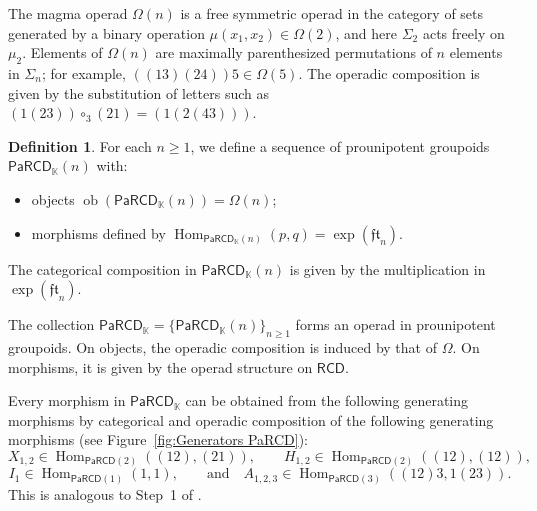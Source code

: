 \documentclass{amsart}
\newcommand{\kk}{\mathbb{K}}    %
\newcommand{\PaRCD}{\mathsf{PaRCD}}
\newcommand{\RCD}{\mathsf{RCD}}
\newcommand{\magma}{\Omega}
\newcommand{\hPaRCD}{{\PaRCD}_{\kk}}
\newcommand{\Hom}{\operatorname{Hom}}
\newcommand{\ob}{\operatorname{ob}}
\theoremstyle{definition}
\newtheorem{definition}[theorem]{Definition}%
\numberwithin{equation}{section}
\begin{document}
The magma operad $\magma(n)$ is a free symmetric operad in the category of sets generated by a binary operation $\mu(x_1,x_2) \in \Omega(2)$, and here $\Sigma_2$ acts freely on $\mu_2$. Elements of $\magma(n)$ are maximally parenthesized permutations of $n$ elements in $\Sigma_n$; for example, $((13)(24))5 \in \magma(5)$. The operadic composition is given by the substitution of letters such as $(1(23)) \circ_3 (21) = (1(2(43)))$. 


\begin{definition}\label{def: PaRCD}
For each $n\geq 1$, we define a sequence of prounipotent groupoids $\hPaRCD(n)$ with: 
\begin{itemize}
    \item objects $\ob(\hPaRCD(n))=\magma(n)$; 
    \item morphisms defined by $\Hom_{\hPaRCD(n)}(p,q) = \exp(\mathfrak{ft}_n)$.
\end{itemize} 
The categorical composition in $\hPaRCD(n)$ is given by the multiplication in $\exp(\mathfrak{ft}_n)$.
\end{definition}

The collection $\hPaRCD=\{\hPaRCD(n)\}_{n\geq 1}$ forms an operad in prounipotent groupoids. On objects, the operadic composition is induced by that of $\magma$. On morphisms, it is given by the operad structure on $\RCD$. 

Every morphism in $\hPaRCD$ can be obtained from the following generating morphisms by categorical and operadic composition of the following generating morphisms (see Figure~\ref{fig:Generators PaRCD}):
\[
X_{1,2} \in \Hom_{\PaRCD(2)}((12),(21)), \qquad
H_{1,2} \in \Hom_{\PaRCD(2)}((12),(12)),
\]
\[
I_1 \in \Hom_{\PaRCD(1)}(1,1), \qquad \text{and} \quad
A_{1,2,3} \in \Hom_{\PaRCD(3)}((12)3,1(23)).
\]
This is analogous to Step~1 of \cite[Theorem 10.3.4]{FresseBook1}.
\end{document}
